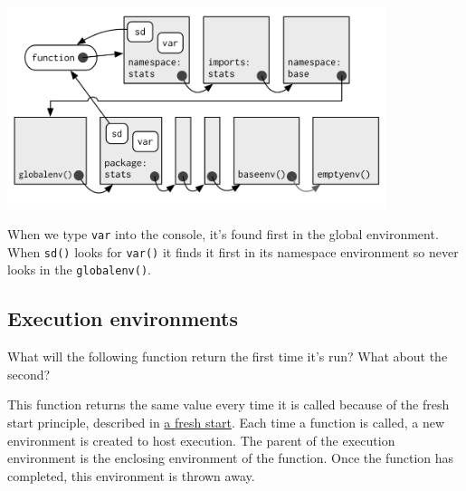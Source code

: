\includegraphics[width=4.35in]{diagrams/environments.png/namespace.png}

When we type \texttt{var} into the console, it's found first in the
global environment. When \texttt{sd()} looks for \texttt{var()} it finds
it first in its namespace environment so never looks in the
\texttt{globalenv()}.

\subsection{Execution environments}

What will the following function return the first time it's run? What
about the second? 

\begin{Shaded}
\begin{Highlighting}[]
\StringTok{ }
  \NormalTok{(}\NormalTok{, } \NormalTok{)) \{}
    \NormalTok{(}\NormalTok{)}
    \StringTok{ }
    \StringTok{ }\StringTok{ }
  \NormalTok{\}}
\NormalTok{\}}
\NormalTok{(}\NormalTok{)}
\NormalTok{(}\NormalTok{)}
\end{Highlighting}
\end{Shaded}

This function returns the same value every time it is called because of
the fresh start principle, described in \hyperref[fresh-start]{a fresh
start}. Each time a function is called, a new environment is created to
host execution. The parent of the execution environment is the enclosing
environment of the function. Once the function has completed, this
environment is thrown away.

